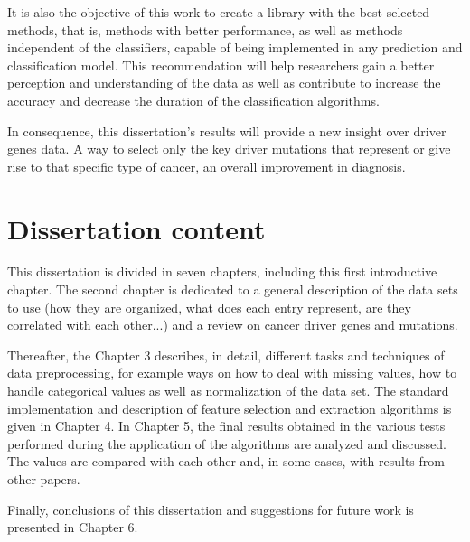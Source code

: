 It is also the objective of this work to create a library with the best selected methods, that is, methods with better performance, as well as methods independent of the classifiers, capable of being implemented in any prediction and classification model. This recommendation will help researchers gain a better perception and understanding of the data as well as contribute to increase the accuracy and decrease the duration of the classification algorithms.

In consequence, this dissertation’s results will provide a new insight over driver genes data. A way to select only the key driver mutations that represent or give rise to that specific type of cancer, an overall improvement in diagnosis.


 
\section{Dissertation content}
\label{dissertation_content}
\hspace{10px}This dissertation is divided in seven chapters, including this first introductive chapter. The second chapter is dedicated to a general description of the data sets to use (how they are organized, what does each entry represent, are they correlated with each other...) and a review on cancer driver genes and mutations. 


Thereafter, the Chapter 3 describes, in detail, different tasks and techniques of data preprocessing, for example ways on how to deal with missing values, how to handle categorical values  as well as normalization of the data set. The standard implementation and description of feature selection and extraction algorithms is given in Chapter 4. In Chapter 5, the final results obtained in the various tests performed during the application of the algorithms are analyzed and discussed. The values are compared with each other and, in some cases, with results from other papers.

Finally, conclusions of this dissertation and suggestions for future work is presented in Chapter 6.
